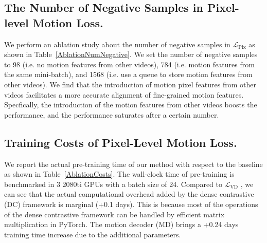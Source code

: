 \documentclass[sigconf,screen]{acmart}
\begin{document}
\subsection{The Number of Negative Samples in Pixel-level Motion Loss.} 
We perform an ablation study about the number of negative samples in $\mathcal{L}_{\mathrm{Pix}}$ 
as shown in Table~\ref{AblationNumNegative}. We set the number of negative samples to 98 (i.e. no motion features from other videos), 784 (i.e. motion features from the same mini-batch), and 1568 (i.e. use a queue to store motion features from other videos). We find that the introduction of motion pixel features from other videos facilitates a more accurate alignment of fine-grained motion features. Specfically, the introduction of the motion features from other videos boosts the performance, and the performance saturates after a certain number.



\begin{table}[htbp]
\normalsize
\renewcommand\arraystretch{1.1}
\setlength{\tabcolsep}{2mm}
\centering
\caption{Ablation study on the training costs of $\mathcal{L}_{\mathrm{Pix}}$. GPU-days is the number of GPUs used for pre-training multiplied by the training time in days.}
\label{AblationCosts}
\end{table}

\subsection{Training Costs of Pixel-Level Motion Loss.} 
 We report the actual pre-training time of our method with respect to the baseline as shown in Table~\ref{AblationCosts}. The wall-clock time of pre-training is benchmarked in 3 2080ti GPUs with a batch size of 24. Compared to $\mathcal{L}_{\mathrm{VD}}$
, we can see that the actual computational overhead added by the dense contrastive (DC) framework is marginal (+0.1 days). This is because most of the operations of the dense contrastive framework can be handled by efficient matrix multiplication in PyTorch. The motion decoder (MD) brings a +0.24 days training time increase due to the additional parameters.
\end{document}
